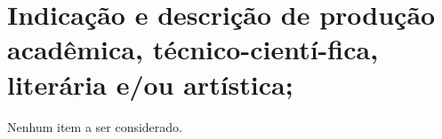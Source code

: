 \section[Indicação e descrição de produção acadêmica, técnico-científica, literária e/ou artística]{Indicação e descrição de produção acadêmica, técnico-cientí\hyp{}fica, literária e/ou artística;}

Nenhum item a ser considerado.